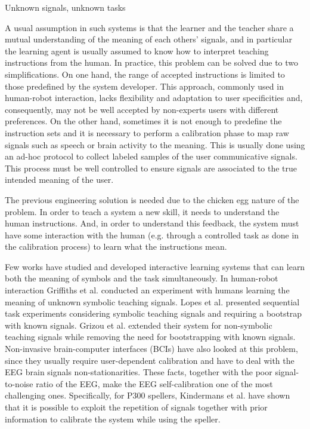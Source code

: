 Unknown signals, unknown tasks

A usual assumption in such systems is that the learner and the teacher share a mutual understanding of the meaning of each others' signals, and in particular the learning agent is usually assumed to know how to interpret teaching instructions from the human. In practice, this problem can be solved due to two simplifications. On one hand, the range of accepted instructions is limited to those predefined by the system developer. This approach, commonly used in human-robot interaction, lacks flexibility and adaptation to user specificities and, consequently, may not be well accepted by non-experts users with different preferences. 
%
On the other hand, sometimes it is not enough to predefine the instruction sets and it is necessary to perform a calibration phase to map raw signals such as speech or brain activity to the meaning. This is usually done using an ad-hoc protocol to collect labeled samples of the user communicative signals. This process must be well controlled to ensure signals are associated to the true intended meaning of the user.

The previous engineering solution is needed due to the chicken egg nature of the problem. In order to teach a system a new skill, it needs to understand the human instructions. And, in order to understand this feedback, the system must have some interaction with the human (e.g. through a controlled task as done in the calibration process) to learn what the instructions mean. 

Few works have studied and developed interactive learning systems that can learn both the meaning of symbols and the task simultaneously. In human-robot interaction Griffiths et al. \cite{griffiths2012bottom} conducted an experiment with humans learning the meaning of unknown symbolic teaching signals. Lopes et al. \cite{macl11simul} presented sequential task experiments considering symbolic teaching signals and requiring a bootstrap with known signals. Grizou et al. \cite{grizou2013robot} extended their system for non-symbolic teaching signals while removing the need for bootstrapping with known signals. Non-invasive brain-computer interfaces (BCIs) have also looked at this problem, since they usually require user-dependent calibration and have to deal with the EEG brain signals non-stationarities. These facts, together with the poor signal-to-noise ratio of the EEG, make the EEG self-calibration one of the most challenging ones. Specifically, for P300 spellers, Kindermans et al. have shown that it is possible to exploit the repetition of signals together with prior information  \cite{Kindermans2012a,Kindermans2012b} to calibrate the system while using the speller.


